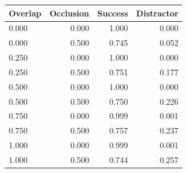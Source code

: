 \begin{tabular}{lrrr}
\toprule
Overlap & Occlusion & Success & Distractor\\
\midrule
0.000 & 0.000 & 1.000 & 0.000\\
0.000 & 0.500 & 0.745 & 0.052\\
0.250 & 0.000 & 1.000 & 0.000\\
0.250 & 0.500 & 0.751 & 0.177\\
0.500 & 0.000 & 1.000 & 0.000\\
0.500 & 0.500 & 0.750 & 0.226\\
0.750 & 0.000 & 0.999 & 0.001\\
0.750 & 0.500 & 0.757 & 0.237\\
1.000 & 0.000 & 0.999 & 0.001\\
1.000 & 0.500 & 0.744 & 0.257\\
\bottomrule
\end{tabular}

